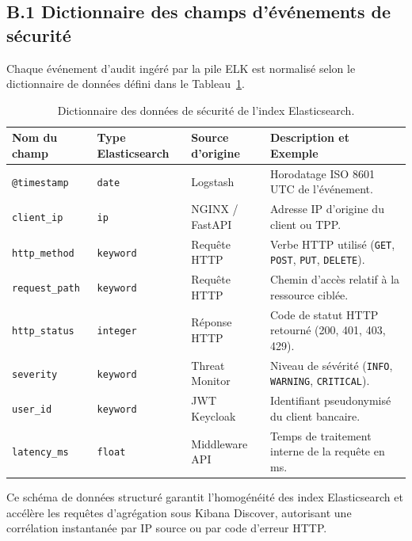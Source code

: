 \subsection*{B.1 Dictionnaire des champs d'événements de sécurité}
Chaque événement d'audit ingéré par la pile ELK est normalisé selon le dictionnaire de données défini dans le Tableau~\ref{tab:annexe_siem_dict}.

\begin{table}[!htbp]
\centering
\small
\begin{tabular}{|l|l|l|p{5.5cm}|}
\hline
\textbf{Nom du champ} & \textbf{Type Elasticsearch} & \textbf{Source d'origine} & \textbf{Description et Exemple} \\ \hline
\texttt{@timestamp} & \texttt{date} & Logstash & Horodatage ISO 8601 UTC de l'événement. \\ \hline
\texttt{client\_ip} & \texttt{ip} & NGINX / FastAPI & Adresse IP d'origine du client ou TPP. \\ \hline
\texttt{http\_method} & \texttt{keyword} & Requête HTTP & Verbe HTTP utilisé (\texttt{GET}, \texttt{POST}, \texttt{PUT}, \texttt{DELETE}). \\ \hline
\texttt{request\_path} & \texttt{keyword} & Requête HTTP & Chemin d'accès relatif à la ressource ciblée. \\ \hline
\texttt{http\_status} & \texttt{integer} & Réponse HTTP & Code de statut HTTP retourné (200, 401, 403, 429). \\ \hline
\texttt{severity} & \texttt{keyword} & Threat Monitor & Niveau de sévérité (\texttt{INFO}, \texttt{WARNING}, \texttt{CRITICAL}). \\ \hline
\texttt{user\_id} & \texttt{keyword} & JWT Keycloak & Identifiant pseudonymisé du client bancaire. \\ \hline
\texttt{latency\_ms} & \texttt{float} & Middleware API & Temps de traitement interne de la requête en ms. \\ \hline
\end{tabular}
\caption{Dictionnaire des données de sécurité de l'index Elasticsearch.}
\label{tab:annexe_siem_dict}
\end{table}

Ce schéma de données structuré garantit l'homogénéité des index Elasticsearch et accélère les requêtes d'agrégation sous Kibana Discover, autorisant une corrélation instantanée par IP source ou par code d'erreur HTTP.

